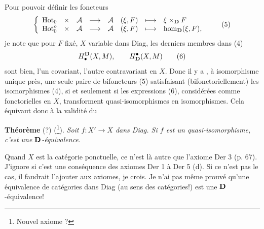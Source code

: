 Pour pouvoir définir les foncteurs
\[
\left\{
\begin{array}{lccccccl}
\Hot_0 & \times & \mathcal{A} & \longrightarrow & \mathcal{A} & (\xi, F) & \longmapsto & \xi \times_{\D} F\\
\Hot_0^o & \times & \mathcal{A} & \longrightarrow & \mathcal{A} & (\xi, F) & \longmapsto & \hm_{\D}(\xi, F),
\end{array}
\right.
\tag*{(5)}
\]
je note que pour $F$ fixé, $X$ variable dans Diag, les
derniers membres dans (4)
\[
H^{\D}_{\bullet}(X, M), \qquad H^{\bullet}_{\D}(X, M)
\tag*{(6)}
\]
sont bien, l'un covariant, l'autre contravariant en $X$. Donc il y a , à isomorphisme unique près, une seule paire de bifoncteurs (5) satisfaisant (bifonctoriellement) les isomorphismes (4), si et seulement si les expressions (6), considérées comme fonctorielles en $X$, transforment quasi-isomorphismes en isomorphismes. Cela équivaut donc à la validité du %

\textbf{Théorème} (?) (\footnote{Nouvel axiome ?}). \textit{Soit $f : X' \longrightarrow X$ dans Diag. Si $f$ est un quasi-isomorphisme, c'est une $\mathbf{D}$-équivalence.}

Quand $X$ est la catégorie ponctuelle, ce n'est là autre que l'axiome Der 3 (p. 67). J'ignore si c'est une conséquence des axiomes Der 1 à Der 5 (d). Si ce n'est pas le cas, il faudrait l'ajouter aux axiomes, je crois. Je n'ai pas même prouvé qu'une équivalence de catégories dans Diag (au sens des catégories!) est une $\mathbf{D}$-équivalence!


